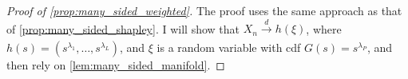 \documentclass[a4paper]{article}
\begin{document}
\begin{proof}[Proof of \cref{prop:many_sided_weighted}]
    The proof uses the same approach as that of \cref{prop:many_sided_shapley}.
    I will show that $X_n \xrightarrow[]{d} h(\xi)$, where $h(s) = (s^{\lambda_1}, \dots, s^{\lambda_L})$, and $\xi$ is a random variable with cdf $G(s) = s^{\lambda_P}$, and then rely on \cref{lem:many_sided_manifold}.

    

\end{proof}
\end{document}
